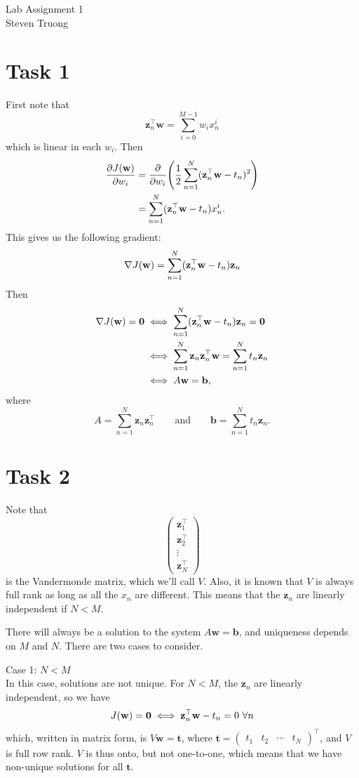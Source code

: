 \documentclass{article}
\newcommand{\T}{\top}
\newcommand{\dpd}[2]{\dfrac{\partial #1}{\partial #2}}
\newcommand{\dpdop}[1]{\dfrac{\partial}{\partial #1}}
\renewcommand{\vec}[1]{\mathbf{#1}}
\DeclarePairedDelimiter{\p}{(}{)}
\begin{document}
{\huge Lab Assignment 1} \\	
\large Steven Truong \\

\section*{Task 1}
First note that
\[
	\vec{z}_n^\T\vec{w} = \sum_{i=0}^{M-1} w_ix_n^i
\]
which is linear in each $w_i$. Then
\begin{align*}
	\dpd{J\p{\vec{w}}}{w_i} &= \dpdop{w_i}\p*{\frac{1}{2}\sum_{n=1}^N \p{\vec{z}_n^\T\vec{w} - t_n}^2} \\
	&= \sum_{n=1}^N \p{\vec{z}_n^\T\vec{w} - t_n}x_n^i.
\end{align*}
This gives us the following gradient:
\[
	\nabla J\p{\vec{w}} = \sum_{n=1}^N \p{\vec{z}_n^\T\vec{w} - t_n}\vec{z}_n
\]
Then
\begin{align*}
	\nabla J\p{\vec{w}} = \vec{0} &\iff \sum_{n=1}^N \p{\vec{z}_n^\T\vec{w} - t_n}\vec{z}_n = \vec{0} \\
	&\iff \sum_{n=1}^N \vec{z}_n\vec{z}_n^\T\vec{w} = \sum_{n=1}^N t_n\vec{z}_n \\
	&\iff A\vec{w} = \vec{b},
\end{align*}
where
\[
	A = \sum_{n=1}^N \vec{z}_n\vec{z}_n^\T \qquad\text{and}\qquad \vec{b} = \sum_{n=1}^N t_n\vec{z}_n.
\]

\pagebreak
\section*{Task 2}
Note that
\[
	\renewcommand{\arraystretch}{1.5}
	\begin{pmatrix}
 		\vec{z}_1^\T \\ \vec{z}_2^\T \\ \vdots \\ \vec{z}_N^\T
 	\end{pmatrix}
\]
is the Vandermonde matrix, which we'll call $V$. Also, it is known that $V$ is always full rank as long as all the $x_n$ are different. This means that the $\vec{z}_n$ are linearly independent if $N < M$.

There will always be a solution to the system $A\vec{w} = \vec{b}$, and uniqueness depends on $M$ and $N$. There are two cases to consider.

Case 1: $N < M$ \\
In this case, solutions are not unique. For $N < M$, the $\vec{z}_n$ are linearly independent, so we have
\[
	J\p{\vec{w}} = \vec{0} \iff \vec{z}_n^\T\vec{w} - t_n = 0\ \forall n
\]
which, written in matrix form, is $V\vec{w} = \vec{t}$, where $\vec{t} = \begin{pmatrix} t_1 & t_2 & \cdots & t_N \end{pmatrix}^\T$, and $V$ is full row rank. $V$ is thus onto, but not one-to-one, which means that we have non-unique solutions for all $\vec{t}$.
\end{document}

